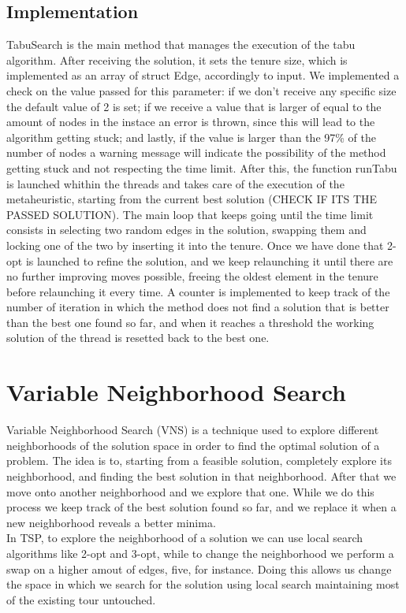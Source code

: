 \subsection{Implementation}
TabuSearch is the main method that manages the execution of the tabu algorithm. After receiving the solution, it sets the tenure size, 
which is implemented as an array of struct Edge, accordingly to input. We implemented a check on the value passed for this parameter: if 
we don't receive any specific size the default value of 2 is set; if we receive a value that is larger of equal to the amount of nodes in 
the instace an error is thrown, since this will lead to the algorithm getting stuck; and lastly, if the value is larger than the 97\% of the 
number of nodes a warning message will indicate the possibility of the method getting stuck and not respecting the time limit.
After this, the function runTabu is launched whithin the threads and takes care of the execution of the metaheuristic, starting from the 
current best solution (CHECK IF ITS THE PASSED SOLUTION). The main loop that keeps going until the time limit consists in selecting two random 
edges in the solution, swapping them and locking one of the two by inserting it into the tenure. Once we have done that 2-opt is launched to 
refine the solution, and we keep relaunching it until there are no further improving moves possible, freeing the oldest element in the tenure 
before relaunching it every time. A counter is implemented to keep track of the number of iteration in which the method does not find a solution 
that is better than the best one found so far, and when it reaches a threshold the working solution of the thread is resetted back to the best one.


\section{Variable Neighborhood Search}
Variable Neighborhood Search (VNS) is a technique used to explore different neighborhoods of the solution space in order to find the
optimal solution of a problem. The idea is to, starting from a feasible solution, completely explore its neighborhood, and finding the
best solution in that neighborhood. After that we move onto another neighborhood and we explore that one. While we do this process
we keep track of the best solution found so far, and we replace it when a new neighborhood reveals a better minima.\\
In TSP, to explore the neighborhood of a solution we can use local search algorithms like 2-opt and 3-opt, while to change the neighborhood
we perform a swap on a higher amout of edges, five, for instance. Doing this allows us change the space in which we search for the 
solution using local search maintaining most of the existing tour untouched.\\

